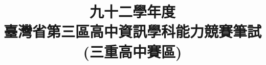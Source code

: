 \documentclass[12pt,a4paper]{report}
\begin{document}
\begin{CJK}{UTF8}{bkai}

\renewcommand{\figurename}{圖}
\renewcommand{\tablename}{表}
\renewcommand{\contentsname}{目~錄~}
\renewcommand{\listfigurename}{插~圖~目~錄}
\renewcommand{\listtablename}{表~格~目~錄}
\renewcommand{\appendixname}{附~錄}
\renewcommand{\bibname}{參~考~文~獻}     %
\renewcommand{\indexname}{索~引}
\renewcommand{\today}{\number\year~年~\number\month~月~\number\day~日}

\title{九十二學年度\\臺灣省第三區高中資訊學科能力競賽筆試\\(三重高中賽區)}
\date{}
\maketitle


\end{CJK}
\end{document}
